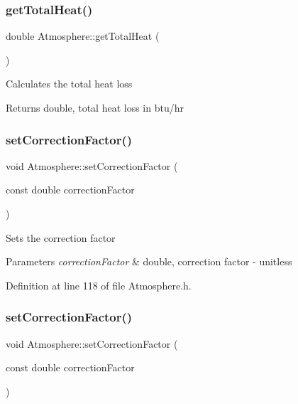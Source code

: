 \subsubsection{\texorpdfstring{get\+Total\+Heat()}{getTotalHeat()}\hspace{0.1cm}{\footnotesize\ttfamily [3/3]}}
{\footnotesize\ttfamily double Atmosphere\+::get\+Total\+Heat (\begin{DoxyParamCaption}{ }\end{DoxyParamCaption})}

Calculates the total heat loss \begin{DoxyReturn}{Returns}
double, total heat loss in btu/hr 
\end{DoxyReturn}
\mbox{\label{class_atmosphere_a86fab4b05de35c9a2b1a3a7e5ab70779}} 
\subsubsection{\texorpdfstring{set\+Correction\+Factor()}{setCorrectionFactor()}\hspace{0.1cm}{\footnotesize\ttfamily [1/3]}}
{\footnotesize\ttfamily void Atmosphere\+::set\+Correction\+Factor (\begin{DoxyParamCaption}\item[{const double}]{correction\+Factor }\end{DoxyParamCaption})\hspace{0.3cm}{\ttfamily [inline]}}

Sets the correction factor 
\begin{DoxyParams}{Parameters}
{\em correction\+Factor} & double, correction factor -\/ unitless \\
\hline
\end{DoxyParams}


Definition at line 118 of file Atmosphere.\+h.

\mbox{\label{class_atmosphere_a86fab4b05de35c9a2b1a3a7e5ab70779}} 
\subsubsection{\texorpdfstring{set\+Correction\+Factor()}{setCorrectionFactor()}\hspace{0.1cm}{\footnotesize\ttfamily [2/3]}}
{\footnotesize\ttfamily void Atmosphere\+::set\+Correction\+Factor (\begin{DoxyParamCaption}\item[{const double}]{correction\+Factor }\end{DoxyParamCaption})\hspace{0.3cm}{\ttfamily [inline]}}

